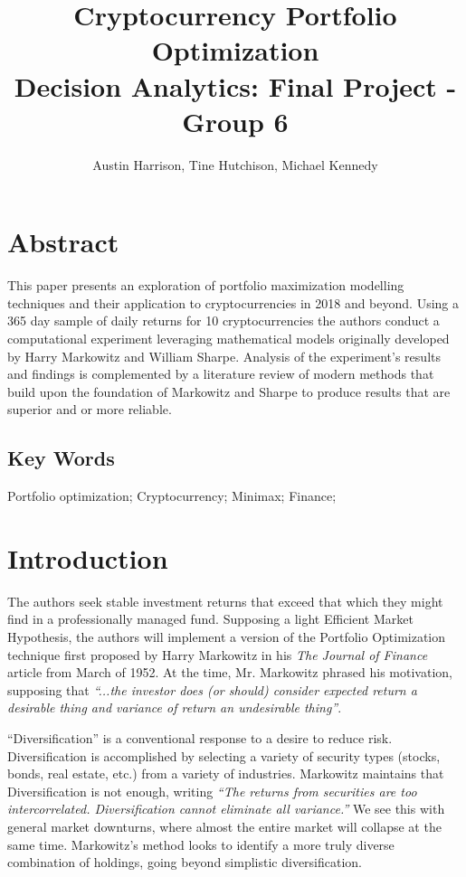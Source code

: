 \documentclass[11pt]{article} %
\title{Cryptocurrency Portfolio Optimization\\
\large Decision Analytics:  Final Project - Group 6}
\author{Austin Harrison, Tine Hutchison, Michael Kennedy}
\begin{document}
\maketitle


\section{Abstract}

This paper presents an exploration of portfolio maximization modelling techniques and their application to cryptocurrencies in 2018 and beyond.  Using a 365 day sample of daily returns for 10 cryptocurrencies the authors conduct a computational experiment leveraging mathematical models originally developed by Harry Markowitz and William Sharpe.  Analysis of the experiment’s results and findings is complemented by a literature review of modern methods that build upon the foundation of Markowitz and Sharpe to produce results that are superior and or more reliable.

\subsection{Key Words}

Portfolio optimization; Cryptocurrency; Minimax; Finance;

\section{Introduction}

The authors seek stable investment returns that exceed that which they might find in a professionally managed fund. Supposing a light Efficient Market Hypothesis, the authors will implement a version of the Portfolio Optimization technique first proposed by Harry Markowitz in his\emph{ The Journal of Finance} article from March of 1952. At the time, Mr. Markowitz phrased his motivation, supposing that\emph{ ``...the investor does (or should) consider expected return a desirable thing and variance of return an undesirable thing”}. \cite{markowitz}

``Diversification” is a conventional response to a desire to reduce risk. Diversification is accomplished by selecting a variety of security types (stocks, bonds, real estate, etc.) from a variety of industries. Markowitz maintains that Diversification is not enough, writing \emph{``The returns from securities are too intercorrelated. Diversification cannot eliminate all variance.”}  \cite{markowitz} We see this with general market downturns, where almost the entire market will collapse at the same time. Markowitz’s method looks to identify a more truly diverse combination of holdings, going beyond simplistic diversification.
\end{document}
